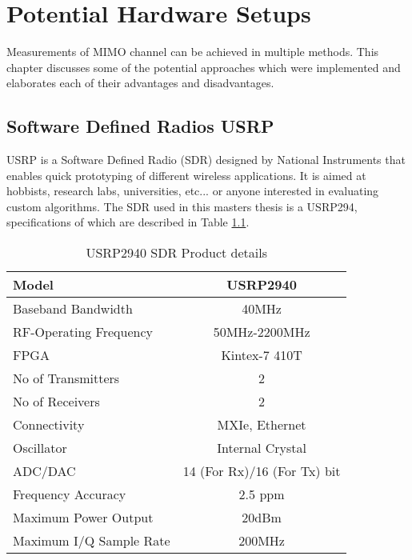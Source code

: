 \chapter{Potential Hardware Setups}
\label{ch:PotenHWSetup}

Measurements of MIMO channel can be achieved in multiple methods. This chapter discusses some of the potential approaches which were implemented and elaborates each of their advantages and disadvantages.

\section{Software Defined Radios USRP}\label{sec:USRP}

USRP is a Software Defined Radio (SDR) designed by National Instruments that enables quick prototyping of different wireless applications. It is aimed at hobbists, research labs, universities, etc... or anyone interested in evaluating custom algorithms. The SDR used in this masters thesis is a USRP294, specifications of which are described in Table \ref{tb:USRP}.

\begin{table}[H]
    \begin{center}
        \begin{tabular}{|l|c|}
        \hline
            Model                   & USRP2940          \\ \hline
            Baseband Bandwidth      & 40MHz             \\ \hline
            RF-Operating Frequency  & 50MHz-2200MHz     \\ \hline
            FPGA                    & Kintex-7 410T     \\ \hline
            No of Transmitters      & 2                 \\ \hline
            No of Receivers         & 2                 \\ \hline
            Connectivity            & MXIe, Ethernet    \\ \hline
            Oscillator              & Internal Crystal  \\ \hline
            ADC/DAC                 & 14 (For Rx)/16 (For Tx) bit         \\ \hline
            Frequency Accuracy      & 2.5 ppm           \\ \hline
            Maximum Power Output    & 20dBm             \\ \hline
            Maximum I/Q Sample Rate & 200MHz            \\ \hline
        \end{tabular}
    \end{center}
    \caption{USRP2940 SDR Product details}
    \label{tb:USRP}
\end{table}


